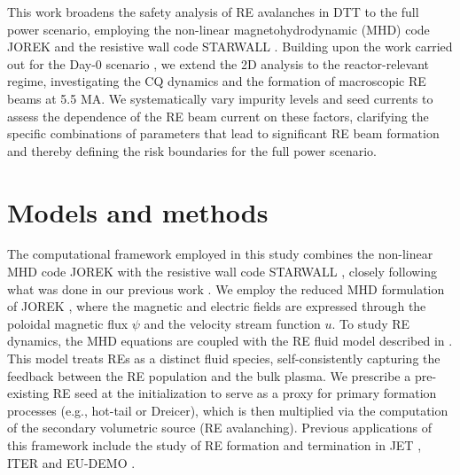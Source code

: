 \documentclass[aip,reprint]{revtex4-1}
\begin{document}
This work broadens the safety analysis of RE avalanches in DTT to the full power scenario, employing the non-linear magnetohydrodynamic (MHD) code JOREK \cite{Hoelzl2021, Hoelzl2024} and the resistive wall code STARWALL \cite{Merkel2015, Hoelzl2012}. Building upon the work carried out for the Day-0 scenario \cite{Emanuelli2025}, we extend the 2D analysis to the reactor-relevant regime, investigating the CQ dynamics and the formation of macroscopic RE beams at 5.5 MA. We systematically vary impurity levels and seed currents to assess the dependence of the RE beam current on these factors, clarifying the specific combinations of parameters that lead to significant RE beam formation and thereby defining the risk boundaries for the full power scenario.


\section{Models and methods}
\label{sec:model}
The computational framework employed in this study combines the non-linear MHD code JOREK \cite{Hoelzl2021, Hoelzl2024} with the resistive wall code STARWALL \cite{Merkel2015, Hoelzl2012}, closely following what was done in our previous work \cite{Emanuelli2025}. We employ the reduced MHD formulation of JOREK \cite{Hoelzl2021, Czarny2008}, where the magnetic and electric fields are expressed through the poloidal magnetic flux $\psi$ and the velocity stream function $u$. To study RE dynamics, the MHD equations are coupled with the RE fluid model described in \cite{Bandaru2019, Bandaru2024a}. This model treats REs as a distinct fluid species, self-consistently capturing the feedback between the RE population and the bulk plasma. We prescribe a pre-existing RE seed at the initialization to serve as a proxy for primary formation processes (e.g., hot-tail or Dreicer), which is then multiplied via the computation of the secondary volumetric source (RE avalanching). Previous applications of this framework include the study of RE formation and termination in JET \cite{Bandaru2021}, ITER \cite{Bandaru2024b, Bergstrom2024, Wang2024} and EU-DEMO \cite{Vannini2025}. 
\end{document}
